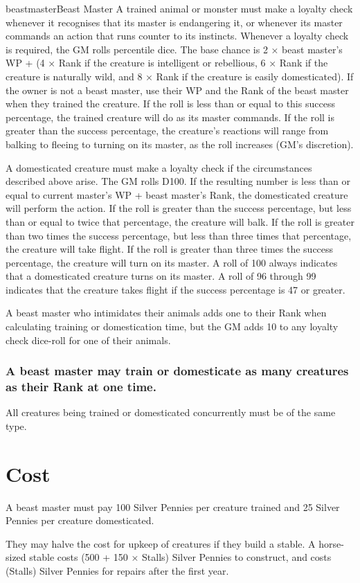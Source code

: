 \begin{Skill}[1.1]{beastmaster}{Beast Master}
A trained animal or monster must make a loyalty check whenever it
recognises that its master is endangering it, or whenever its master
commands an action that runs counter to its instincts.  Whenever a
loyalty check is required, the GM rolls percentile dice.  The base
chance is 2 × beast master’s WP + (4 × Rank if the creature is
intelligent or rebellious, 6 × Rank if the creature is naturally wild,
and 8 × Rank if the creature is easily domesticated).  If the owner is
not a beast master, use their WP and the Rank of the beast master when
they trained the creature. If the roll is less than or equal to this
success percentage, the trained creature will do as its master
commands.  If the roll is greater than the success percentage, the
creature’s reactions will range from balking to fleeing to turning
on its master, as the roll increases (GM’s discretion).

A domesticated creature must make a loyalty check if the circumstances
described above arise.  The GM rolls D100. If the resulting number is
less than or equal to current master’s WP + beast master’s Rank, the
domesticated creature will perform the action.  If the roll is greater
than the success percentage, but less than or equal to twice that
percentage, the creature will balk. If the roll is greater than two
times the success percentage, but less than three times that
percentage, the creature will take flight. If the roll is greater than
three times the success percentage, the creature will turn on its
master.  A roll of 100 always indicates that a domesticated creature
turns on its master. A roll of 96 through 99 indicates that the
creature takes flight if the success percentage is 47 or greater.

A beast master who intimidates their animals adds one to their Rank
when calculating training or domestication time, but the GM adds 10 to
any loyalty check dice-roll for one of their animals.

\subsubsection{A beast master may train or domesticate as many creatures as their
Rank at one time.}

All creatures being trained or domesticated concurrently must be of
the same type.

\section{Cost}

A beast master must pay 100 Silver Pennies per creature trained and 25
Silver Pennies per creature domesticated.

They may halve the cost for upkeep of creatures if they build a
stable.  A horse-sized stable costs (500 + 150 × Stalls) Silver
Pennies to construct, and costs (Stalls) Silver Pennies for repairs
after the first year.

\end{Skill}

